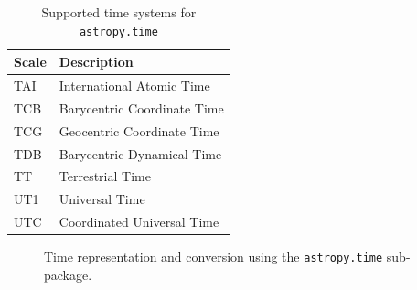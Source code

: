 \documentclass[traditabstract]{aa}
\begin{document}
\begin{table}
\caption{Supported time systems for \texttt{astropy.time}\label{tab:time_systems}}
\center
\begin{tabular}{ll}
\hline
Scale  & Description \\
\hline
TAI    & International Atomic Time \\
TCB    & Barycentric Coordinate Time \\
TCG    & Geocentric Coordinate Time \\
TDB    & Barycentric Dynamical Time \\
TT     & Terrestrial Time \\
UT1    & Universal Time \\
UTC    & Coordinated Universal Time \\
\hline
\end{tabular}
\end{table}

\begin{figure}
\center
\caption{Time representation and conversion using the \texttt{astropy.time}
sub-package.\label{code:time}}
\vspace{0.1in}
\end{figure}
\end{document}
